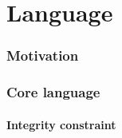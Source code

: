 \part{Language}
\section{Motivation}

\section{Core language}
\subsection{Integrity constraint}

% 
% 
% 
%

